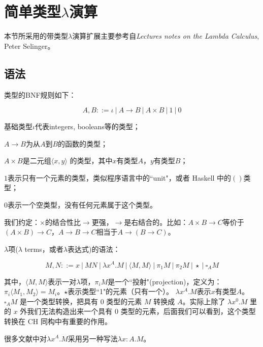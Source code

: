 \section{简单类型$\lambda$演算}

本节所采用的带类型$\lambda$演算扩展主要参考自\emph{Lectures notes on the Lambda Calculus}, Peter Selinger。

\subsection{语法}

类型的BNF规则如下：

$$A, B ::= \iota \ | \ A \to B \ | \ A \times B  \ | \ 1 \ | \ 0$$

\begin{tightenum}
  \item 基础类型$\iota$代表integers, booleans等的类型；
  \item $A \to B$为从$A$到$B$的函数的类型；
  \item $A \times B$是二元组$\langle x, y \rangle$ 的类型，其中$x$有类型$A$，$y$有类型$B$；
  \item $1$表示只有一个元素的类型，类似程序语言中的``unit"，或者 Haskell 中的$()$类型；
  \item $0$表示一个空类型，没有任何元素属于这个类型。
\end{tightenum}


我们约定：$\times$的结合性比$\to$更强，$\to$是右结合的。比如：$A \times B \to C$等价于$(A \times B) \to C$，$A \to B \to C$相当于$A \to (B \to C)$。


$\lambda$项($\lambda$ terms，或者$\lambda$表达式)的语法：

$$M, N ::= x \ | \ M N \ | \ \lambda x^A . M \ | \ \langle M, M \rangle \ | \ \pi_1 M \ | \ \pi_2 M \ | \ \star \ | \ \square_{A} M$$

其中，$\langle M, M \rangle$表示一对$\lambda$项，$\pi_i M$是一个``投射"(projection)，定义为：$\pi_i \langle M_1, M_2 \rangle = M_i$。$\star$表示类型``1"的元素（只有一个）。 $\lambda x^A. M$表示$x$有类型$A$。$\square_{A} M$ 是一个类型转换，把具有 $0$ 类型的元素 $M$ 转换成 $A$。实际上除了 $\lambda x^0. M$ 里的 $x$ 外我们无法构造出来一个具有 $0$ 类型的元素，后面我们可以看到，这个类型转换在 CH 同构中有重要的作用。

\begin{rem}

很多文献中对$\lambda x^A. M$采用另一种写法$\lambda x:A. M$。
\end{rem}


